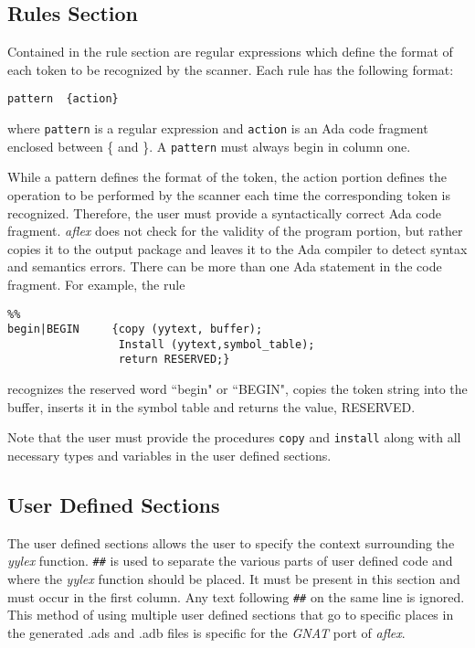 \subsection{Rules Section}

Contained in the rule section are regular expressions which define the
format of each token to be recognized by the scanner.
Each rule has the following format:

\begin{verbatim}
pattern  {action}
\end{verbatim}

where {\tt pattern} is a regular expression and {\tt action} is an Ada 
code fragment enclosed between \{ and \}.  A {\tt pattern} must 
always begin in column one.

\mysk
While a pattern defines the format of the token, the action portion
defines
the operation to be performed by the scanner each time the corresponding
token is recognized.  Therefore, the user must provide a syntactically
correct Ada code fragment.  {\sl aflex} does not check for the validity of the
program portion, but rather copies it to the output package and leaves it to
the Ada compiler to detect syntax and semantics errors.  There can be more 
than one Ada statement in the code fragment.  For example, the rule

\small
\begin{verbatim}
%%
begin|BEGIN     {copy (yytext, buffer);
                 Install (yytext,symbol_table);
                 return RESERVED;}
\end{verbatim}
\normalsize

recognizes the reserved word ``begin" or ``BEGIN", copies the
token string into the buffer, inserts it in the symbol table and returns 
the value, RESERVED.  

Note that the user must provide the procedures
{\tt copy} and {\tt install} along with all necessary types and variables
in the user defined sections.

\subsection{User Defined Sections}
The user defined sections allows the user to specify the context surrounding
the {\sl yylex} function.  \verb|##| is used to separate the various parts
of user defined code and where the {\sl yylex} function should be placed. 
It must be present in this section and must occur in the first column.  
Any text following \verb|##| on the same line is ignored. This method of
using multiple user defined sections that go to specific places in the
generated .ads and .adb files is specific for the {\sl GNAT} port of 
{\sl aflex}.

